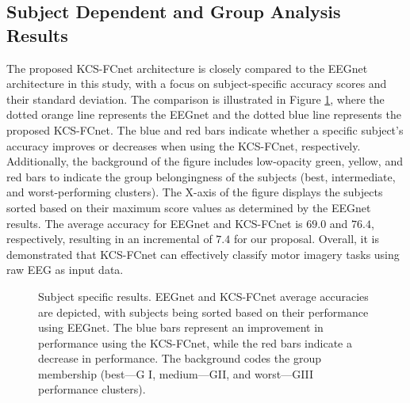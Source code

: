 \subsection{Subject Dependent and Group Analysis Results}

The proposed KCS-FCnet architecture is closely compared to the EEGnet architecture in this study, with a focus on subject-specific accuracy scores and their standard deviation. The comparison is illustrated in Figure \ref{fig:compeeggfc}, where the dotted orange line represents the EEGnet and the dotted blue line represents the proposed KCS-FCnet. The blue and red bars indicate whether a specific subject's accuracy improves or decreases when using the KCS-FCnet, respectively. Additionally, the background of the figure includes low-opacity green, yellow, and red bars to indicate the group belongingness of the subjects (best, intermediate, and worst-performing clusters). The X-axis of the figure displays the subjects sorted based on their maximum score values as determined by the EEGnet results. The average accuracy for EEGnet and KCS-FCnet is $69.0$ and $76.4$, respectively, resulting in an incremental of $7.4$ for our proposal. Overall, it is demonstrated that KCS-FCnet can effectively classify motor imagery tasks using raw EEG as input data.

\begin{figure}[h!]
    \centering
    \resizebox{\linewidth}{!}{}
    \caption{Subject specific results. EEGnet and KCS-FCnet average accuracies are depicted, with subjects being sorted based on their performance using   EEGnet. The blue bars represent an improvement in performance using the KCS-FCnet, while the red bars indicate a decrease in performance. The background codes the group membership (best---G I, medium---GII, and worst---GIII performance clusters).}\label{fig:compeeggfc}
\end{figure}


